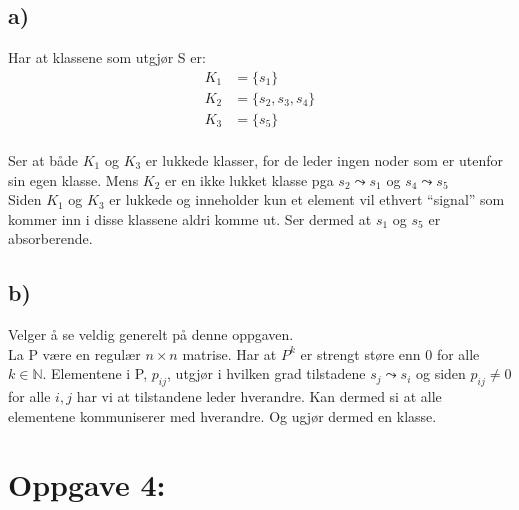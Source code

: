 \documentclass[a4paper, norsk, twoside, 10pt]{article}
\begin{document}
\begin{flushleft}


  \subsection*{a)}
  Har at klassene som utgjør S er:
  \begin{align*}
    K_{1} &= \{s_{1}\} \\
    K_{2} &= \{s_{2}, s_{3}, s_{4}\} \\
    K_{3} &= \{s_{5}\}\\
  \end{align*}

  Ser at både $K_{1}$ og $K_{3}$ er lukkede klasser, for de leder ingen noder som er utenfor sin egen klasse. Mens $K_{2}$ er en ikke lukket klasse pga $s_{2} \leadsto s_{1}$ og  $s_{4} \leadsto s_{5}$
  \ \\
  Siden $K_{1}$ og $K_{3}$ er lukkede og inneholder kun et element vil ethvert ``signal'' som kommer inn i disse klassene aldri komme ut. Ser dermed at $s_{1}$ og $s_{5}$ er absorberende.

  \subsection*{b)}

  Velger å se veldig generelt på denne oppgaven. \\
  La P være en regulær $n \times n$ matrise. Har at $P^{k}$ er strengt støre enn 0 for alle $k \in \mathbb{N}$. Elementene i P, $p_{ij}$, utgjør i hvilken grad tilstadene $s_{j} \leadsto s_{i}$ og siden  $p_{ij} \neq 0$ for alle $i,j$ har vi at tilstandene leder hverandre. Kan dermed si at alle elementene kommuniserer med hverandre. Og ugjør dermed en klasse.

  \section*{Oppgave 4:}


\end{flushleft}
\end{document}
